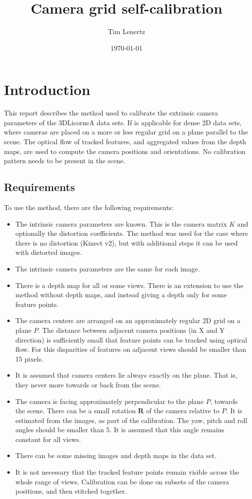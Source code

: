 \documentclass{scrreprt}
\title{Camera grid self-calibration}
\author{Tim Lenertz}
\date{\today}
\newcommand{\matr}[1]{\mathbf{#1}}
\begin{document}
\maketitle

\tableofcontents

\chapter{Introduction}
This report describes the method used to calibrate the extrinsic camera parameters of the 3DLicorneA data sets. If is applicable for dense 2D data sets, where cameras are placed on a more or less regular grid on a plane parallel to the scene. The optical flow of tracked features, and aggregated values from the depth maps, are used to compute the camera positions and orientations. No calibration pattern needs to be present in the scene.

\section{Requirements}
To use the method, there are the following requirements:
\begin{itemize}
\item The intrinsic camera parameters are known. This is the camera matrix $K$ and optionally the distortion coefficients. The method was used for the case where there is no distortion (Kinect v2), but with additional steps it can be used with distorted images.
\item The intrinsic camera parameters are the same for each image.
\item There is a depth map for all or some views. There is an extension to use the method without depth maps, and instead giving a depth only for some feature points.
\item The camera centers are arranged on an approximately regular 2D grid on a plane $P$. The distance between adjacent camera positions (in X and Y direction) is sufficiently small that feature points can be tracked using optical flow. For this disparities of features on adjacent views should be smaller than 15 pixels.
\item It is assumed that camera centers lie always exactly on the plane. That is, they never more towards or back from the scene. 
\item The camera is facing approximately perpendicular to the plane $P$, towards the scene. There can be a small rotation $\matr{R}$ of the camera relative to $P$. It is estimated from the images, as part of the calibration. The yaw, pitch and roll angles should be smaller than 5\textdegree. It is assumed that this angle remains constant for all views.
\item There can be some missing images and depth maps in the data set.
\item It is not necessary that the tracked feature points remain visible across the whole range of views. Calibration can be done on subsets of the camera positions, and then stitched together.
\end{itemize}
\end{document}
